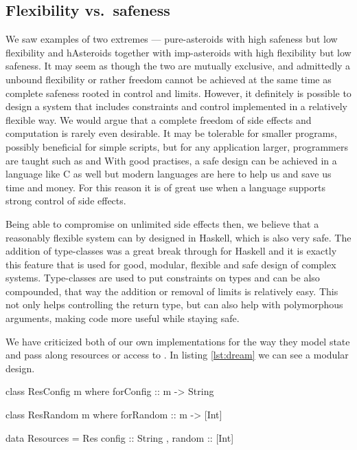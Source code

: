 \documentclass[
  digital, %
  color,   %
  table,   %
  oneside, %
  lof,     %
  lot,     %
]{fithesis3}
\newcommand{\vs}{vs.\ }
\begin{document}
{\subsection{Flexibility \vs safeness}
We saw examples of two extremes --- pure-asteroids with high safeness but low flexibility
and hAsteroids together with imp-asteroids with high flexibility but low safeness.
It may seem as though the two are mutually exclusive, and admittedly a unbound flexibility
or rather freedom cannot be achieved at the same time as complete safeness rooted in control
and limits. However, it definitely is possible to design a system that includes
constraints and control implemented in a relatively flexible way. We would argue that
a complete freedom of side effects and computation is rarely even desirable.
It may be tolerable for smaller programs, possibly beneficial for simple scripts,
but for any application larger, programmers are taught  such as
 and 
With good practises, a safe design can be achieved in a language like C as well
but modern languages are here to help us and save us time and money.
For this reason it is of great use when a language supports strong control
of side effects.

Being able to compromise on unlimited side effects then, we believe that a reasonably flexible
system can by designed in Haskell, which is also very safe.
The addition of type-classes was a great break through for Haskell and it is exactly this
feature that is used for good, modular, flexible and safe design of complex systems.
Type-classes are used to put constraints on types and can be also compounded,
that way the addition or removal of limits is relatively easy.
This not only helps controlling the return type, but can also help
with polymorphous arguments, making code more useful while staying safe.

We have criticized both of our own implementations for the way they model state
and pass along resources or access to . In listing \ref{lst:dream}
we can see a modular design.

\begin{listing}
\begin{haskell}
class ResConfig m where
    forConfig :: m -> String

class ResRandom m where
    forRandom :: m -> [Int]


data Resources =
    Res
    { config :: String
    , random :: [Int]
    }


\end{haskell}
\end{listing}}
\end{document}
